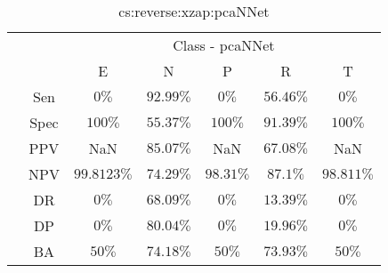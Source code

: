 \begin{table}[!ht]
	\centering
	\begin{tabular}{|c|c|c|c|c|c|c|}
		\cline{3-7}
		\multicolumn{2}{c|}{} & \multicolumn{5}{c|}{Class - pcaNNet} \\ \cline{3-7}
		\multicolumn{2}{c|}{} & E & N & P & R & T \\ \hline
		\multirow{7}{*}{\rotatebox{90}{Statistics}} & Sen & $0\%$ & $92.99\%$ & $0\%$ & $56.46\%$ & $0\%$ \\ \cline{2-7}
		 & Spec & $100\%$ & $55.37\%$ & $100\%$ & $91.39\%$ & $100\%$ \\ \cline{2-7}
		 & PPV & NaN & $85.07\%$ & NaN & $67.08\%$ & NaN \\ \cline{2-7}
		 & NPV & $99.8123\%$ & $74.29\%$ & $98.31\%$ & $87.1\%$ & $98.811\%$ \\ \cline{2-7}
		 & DR & $0\%$ & $68.09\%$ & $0\%$ & $13.39\%$ & $0\%$ \\ \cline{2-7}
		 & DP & $0\%$ & $80.04\%$ & $0\%$ & $19.96\%$ & $0\%$ \\ \cline{2-7}
		 & BA & $50\%$ & $74.18\%$ & $50\%$ & $73.93\%$ & $50\%$ \\ \hline
	\end{tabular}
	\caption{cs:reverse:xzap:pcaNNet}
	\label{tab:cs:reverse:xzap:pcaNNet}
\end{table}
